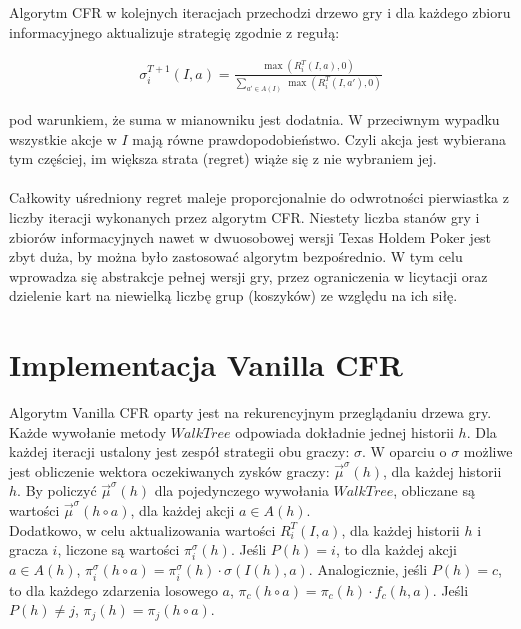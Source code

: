 \documentclass[licencjacka]{pracamgr}
\begin{document}
\noindent
Algorytm CFR w kolejnych iteracjach przechodzi drzewo gry i dla każdego zbioru informacyjnego aktualizuje strategię
zgodnie z regułą:

\begin{align*}
\sigma_i^{T+1} (I, a) = \frac{\max(R_i^T(I, a), 0)}{\sum\limits_{a' \in A(I)} \, \max(R_i^T(I, a'), 0)}
\end{align*}

\noindent
pod warunkiem, że suma w mianowniku jest dodatnia. W przeciwnym wypadku wszystkie akcje w $I$ mają równe prawdopodobieństwo.
Czyli akcja jest wybierana tym częściej, im większa strata (regret) wiąże się z nie wybraniem jej.\\\\

\noindent
Całkowity uśredniony regret maleje proporcjonalnie do odwrotności pierwiastka z liczby iteracji wykonanych przez algorytm CFR. Niestety
liczba stanów gry i zbiorów informacyjnych nawet w dwuosobowej wersji Texas Holdem Poker jest zbyt duża, by można było
zastosować algorytm bezpośrednio. W tym celu wprowadza się abstrakcje pełnej wersji gry, przez ograniczenia w licytacji
oraz dzielenie kart na niewielką liczbę grup (koszyków) ze względu na ich siłę. \\

\section{Implementacja Vanilla CFR}

\noindent
Algorytm Vanilla CFR oparty jest na rekurencyjnym przeglądaniu drzewa gry. Każde wywołanie metody $WalkTree$ odpowiada dokładnie jednej
historii $h$. Dla każdej iteracji ustalony jest zespół strategii obu
graczy: $\sigma$. W oparciu o $\sigma$ możliwe jest obliczenie wektora oczekiwanych zysków graczy: $\vec{\mu}^{\sigma}(h)$, dla każdej historii $h$.
By policzyć $\vec{\mu}^{\sigma}(h)$ dla pojedynczego wywołania $WalkTree$, obliczane są wartości $\vec{\mu}^{\sigma}(h \circ a)$, dla każdej
akcji $a \in A(h)$. \\ 

\noindent
Dodatkowo, w celu aktualizowania wartości $R_i^T(I, a)$, dla każdej historii $h$ i gracza $i$, liczone są wartości $\pi_i^{\sigma}(h)$.
Jeśli $P(h) = i$, to dla każdej akcji $a \in A(h)$, $\pi_i^{\sigma}(h \circ a) = \pi_i^{\sigma}(h) \cdot \sigma(I(h), a)$.
Analogicznie, jeśli $P(h) = c$, to dla każdego zdarzenia losowego $a$, $\pi_c(h \circ a) = \pi_c(h) \cdot f_c(h, a)$.
Jeśli $P(h) \neq j$, $\pi_j(h) = \pi_j(h \circ a)$. \\
\end{document}
